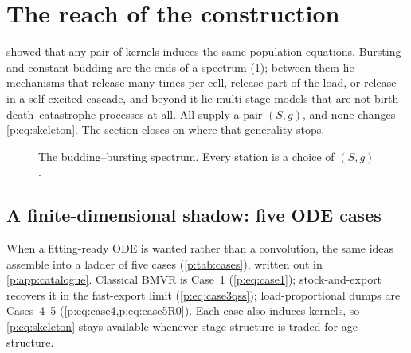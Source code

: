 
\section{The reach of the construction}
\label{p:sec:reach}

 showed that any pair of kernels induces the same
population equations. Bursting and constant budding are the ends of a
spectrum (\cref{p:fig:spectrum}); between them lie mechanisms that release
many times per cell, release part of the load, or release in a self-excited
cascade, and beyond it lie multi-stage models that are not
birth--death--catastrophe processes at all. All supply a pair $(S,g)$, and
none changes \cref{p:eq:skeleton}. The section closes on where that
generality stops.

\begin{figure}[tbp]
\centering
{}
\caption{The budding--bursting spectrum. Every station is a choice of
$(S,g)$.}
\label{p:fig:spectrum}
\end{figure}

\subsection{A finite-dimensional shadow: five ODE cases}
\label{p:sec:odecases}

When a fitting-ready ODE is wanted rather than a convolution, the same ideas
assemble into a ladder of five cases (\cref{p:tab:cases}), written out in
\cref{p:app:catalogue}. Classical BMVR is Case~1
(\cref{p:eq:case1}); stock-and-export recovers it in the fast-export limit
(\cref{p:eq:case3qss}); load-proportional dumps are Cases~4--5
(\cref{p:eq:case4,p:eq:case5R0}). Each case also induces kernels, so
\cref{p:eq:skeleton} stays available whenever stage structure is traded for
age structure.

